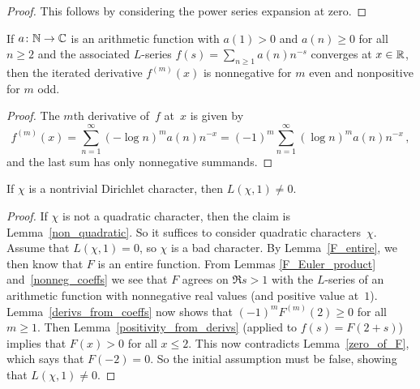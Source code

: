 \begin{proof}
  \leanok
  This follows by considering the power series expansion at zero.
\end{proof}

\begin{lemma} \label{derivs_from_coeffs}
  If $a \colon \mathbb{N} \to \mathbb{C}$ is an arithmetic function with $a(1) > 0$ and $a(n) \ge 0$ for all $n \ge 2$
  and the associated $L$-series $f(s) = \sum_{n \ge 1} a(n) n^{-s}$ converges at $x \in \mathbb{R}$, then
  the iterated derivative $f^{(m)}(x)$ is nonnegative for $m$ even and nonpositive for $m$ odd.
\end{lemma}

\begin{proof}
  The $m$th derivative of~$f$ at~$x$ is given by
  \[ f^{(m)}(x) = \sum_{n=1}^\infty (-\log n)^m a(n) n^{-x} = (-1)^m \sum_{n=1}^\infty (\log n)^m a(n) n^{-x} \,, \]
  and the last sum has only nonnegative summands.
\end{proof}

\begin{theorem} \label{quadratic_char_nonvanishing}
  If $\chi$ is a nontrivial Dirichlet character, then $L(\chi, 1) \ne 0$.
\end{theorem}

\begin{proof}
  If $\chi$ is not a quadratic character, then the claim is Lemma~\ref{non_quadratic}.
  So it suffices to consider quadratic characters~$\chi$.
  Assume that $L(\chi, 1) = 0$, so $\chi$ is a bad character. By Lemma~\ref{F_entire}, we then know
  that $F$ is an entire function. From Lemmas \ref{F_Euler_product} and~\ref{nonneg_coeffs} we see
  that $F$ agrees on $\Re s > 1$ with the $L$-series of an arithmetic function with nonnegative
  real values (and positive value at~$1$). Lemma~\ref{derivs_from_coeffs} now shows that
  $(-1)^m F^{(m)}(2) \ge 0$ for all~$m \ge 1$. Then Lemma~\ref{positivity_from_derivs}
  (applied to $f(s) = F(2+s)$) implies that $F(x) > 0$ for all $x \le 2$. This now
  contradicts Lemma~\ref{zero_of_F}, which says that $F(-2) = 0$. So the initial assumption
  must be false, showing that $L(\chi, 1) \ne 0$.
\end{proof}
